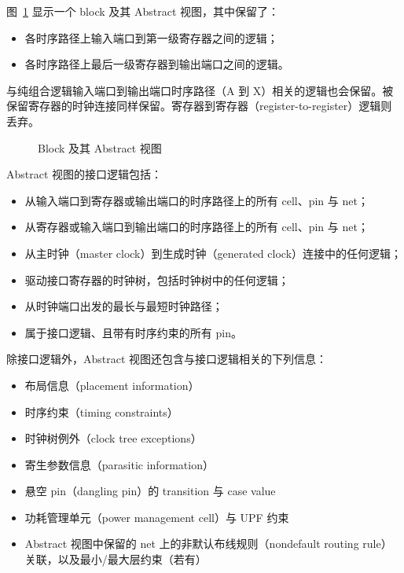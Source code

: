 图~\ref{fig:hier-abstract-view} 显示一个 block 及其 Abstract 视图，其中保留了：
\begin{itemize}
  \item 各时序路径上输入端口到第一级寄存器之间的逻辑；
  \item 各时序路径上最后一级寄存器到输出端口之间的逻辑。
\end{itemize}

与纯组合逻辑输入端口到输出端口时序路径（A 到 X）相关的逻辑也会保留。被保留寄存器的时钟连接同样保留。寄存器到寄存器（register-to-register）逻辑则丢弃。

\begin{figure}[htbp]
\centering
{}
\caption{Block 及其 Abstract 视图}
\label{fig:hier-abstract-view}
\end{figure}

Abstract 视图的接口逻辑包括：
\begin{itemize}
  \item 从输入端口到寄存器或输出端口的时序路径上的所有 cell、pin 与 net；
  \item 从寄存器或输入端口到输出端口的时序路径上的所有 cell、pin 与 net；
  \item 从主时钟（master clock）到生成时钟（generated clock）连接中的任何逻辑；
  \item 驱动接口寄存器的时钟树，包括时钟树中的任何逻辑；
  \item 从时钟端口出发的最长与最短时钟路径；
  \item 属于接口逻辑、且带有时序约束的所有 pin。
\end{itemize}

除接口逻辑外，Abstract 视图还包含与接口逻辑相关的下列信息：
\begin{itemize}
  \item 布局信息（placement information）
  \item 时序约束（timing constraints）
  \item 时钟树例外（clock tree exceptions）
  \item 寄生参数信息（parasitic information）
  \item 悬空 pin（dangling pin）的 transition 与 case value
  \item 功耗管理单元（power management cell）与 UPF 约束
  \item Abstract 视图中保留的 net 上的非默认布线规则（nondefault routing rule）关联，以及最小/最大层约束（若有）
\end{itemize}

